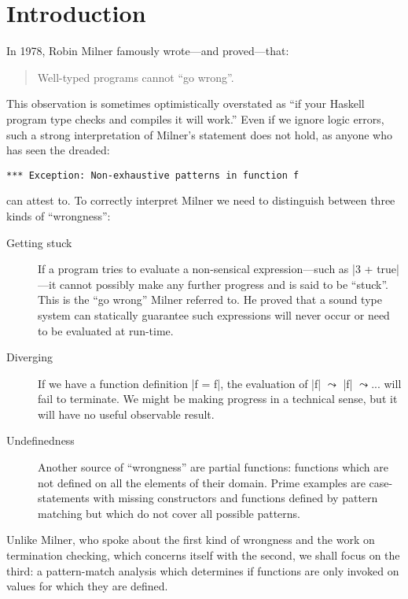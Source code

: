 \chapter{Introduction}\label{chapintroduction}

In 1978, Robin Milner \cite{Milner78atheory} famously wrote---and proved---that:
\begin{quotation}
Well-typed programs cannot ``go wrong''. 
\end{quotation}
This observation is sometimes
optimistically overstated as ``if your Haskell program type checks and compiles it will work.'' Even if we ignore logic errors, such a strong interpretation of Milner's statement does not hold, as anyone who has seen the dreaded:
\begin{verbatim}
*** Exception: Non-exhaustive patterns in function f
\end{verbatim}
can attest to. To correctly interpret Milner we need to distinguish between three kinds of ``wrongness'':
\begin{description}
\item[Getting stuck] If a program tries to evaluate a non-sensical expression---such as |3 + true|---it cannot possibly make any further progress and is said to be ``stuck''. This is the ``go wrong'' Milner referred to. He proved that a sound type system can statically guarantee such expressions will never occur or need to be evaluated at run-time.
\item[Diverging] If we have a function definition |f = f|, the evaluation of |f| $\leadsto$ |f| $\leadsto ...$ will fail to terminate. We might be making progress in a technical sense, but it will have no useful observable result.
\item[Undefinedness] Another source of ``wrongness'' are partial functions: functions which are not defined on all the elements of their domain. Prime examples are case-statements with missing constructors and functions defined by pattern matching but which do not cover all possible patterns. 
\end{description}

Unlike Milner, who spoke about the first kind of wrongness and the work on termination checking, which concerns itself with the second, we shall focus on the third: a pattern-match analysis which determines if functions are only invoked on values for which they are defined.

